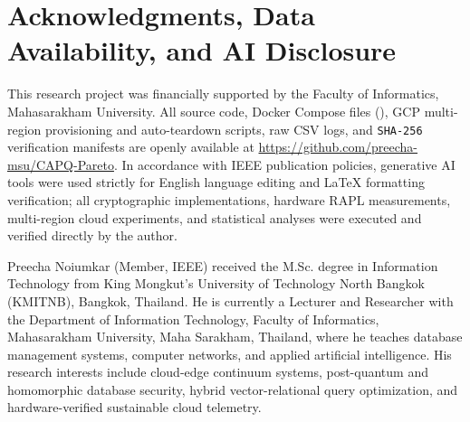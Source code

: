 \documentclass[10pt,journal,compsoc]{IEEEtran}
\begin{document}
\FloatBarrier
\section*{Acknowledgments, Data Availability, and AI Disclosure}
This research project was financially supported by the Faculty of Informatics, Mahasarakham University. All source code, Docker Compose files (), GCP multi-region provisioning and auto-teardown scripts, raw CSV logs, and \texttt{SHA-256} verification manifests are openly available at \url{https://github.com/preecha-msu/CAPQ-Pareto}. In accordance with IEEE publication policies, generative AI tools were used strictly for English language editing and LaTeX formatting verification; all cryptographic implementations, hardware RAPL measurements, multi-region cloud experiments, and statistical analyses were executed and verified directly by the author.




\begin{IEEEbiographynophoto}{Preecha Noiumkar}
(Member, IEEE) received the M.Sc. degree in Information Technology from King Mongkut's University of Technology North Bangkok (KMITNB), Bangkok, Thailand. He is currently a Lecturer and Researcher with the Department of Information Technology, Faculty of Informatics, Mahasarakham University, Maha Sarakham, Thailand, where he teaches database management systems, computer networks, and applied artificial intelligence. His research interests include cloud-edge continuum systems, post-quantum and homomorphic database security, hybrid vector-relational query optimization, and hardware-verified sustainable cloud telemetry.
\end{IEEEbiographynophoto}
\end{document}
